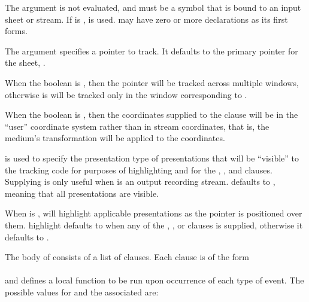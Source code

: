 The  argument is not evaluated, and must be a symbol that is bound to
an input sheet or stream.  If  is ,  is
used.   may have zero or more declarations as its first forms.

The  argument specifies a pointer to track.  It defaults to
the primary pointer for the sheet, .

When the boolean  is , then the pointer will be
tracked across multiple windows, otherwise is will be tracked only in the window
corresponding to .

When the boolean  is , then the coordinates supplied
to the  clause will be in the ``user'' coordinate system
rather than in stream coordinates, that is, the medium's transformation will be
applied to the coordinates.

 is used to specify the presentation type of presentations
that will be ``visible'' to the tracking code for purposes of highlighting and
for the , , and
 clauses.  Supplying  is only
useful when  is an output recording stream.  
defaults to , meaning that all presentations are visible.

When  is ,  will highlight
applicable presentations as the pointer is positioned over them.  {highlight}
defaults to  when any of the ,
, or  clauses is
supplied, otherwise it defaults to .

The body of  consists of a list of clauses.  Each clause is
of the form
\\
\\
and defines a local function to be run upon occurrence of each type of event.
The possible values for  and the associated 
are:

